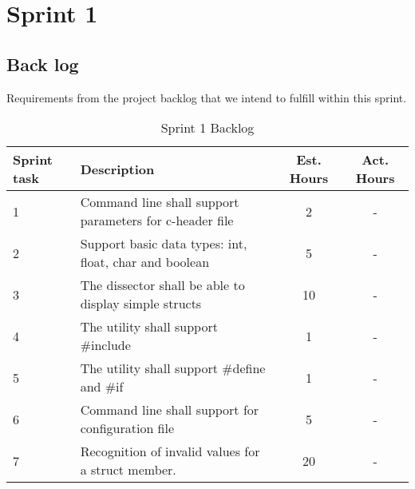 \chapter{Sprint 1}

\section{Back log}
Requirements from the project backlog that we intend to fulfill within this sprint.

\begin{table}[ht] \center
\caption{Sprint 1 Backlog}
\begin{tabular}{m{1cm} p{6cm} c  c}
	Sprint task & Description & Est. Hours & Act. Hours \\
	\hline
	1 & Command line shall support parameters for c-header file & 2 & -\\
	2 & Support basic data types: int, float, char and boolean & 5 & -\\	
	3 & The dissector shall be able to display simple structs & 10 & -\\
	4 & The utility shall support \#include & 1 & -\\
	5 & The utility shall support \#define and \#if & 1 & -\\	
	6 & Command line shall support for configuration file & 5 & -\\
	7 & Recognition of invalid values for a struct member. & 20 & -\\
\end{tabular}
\end{table}

